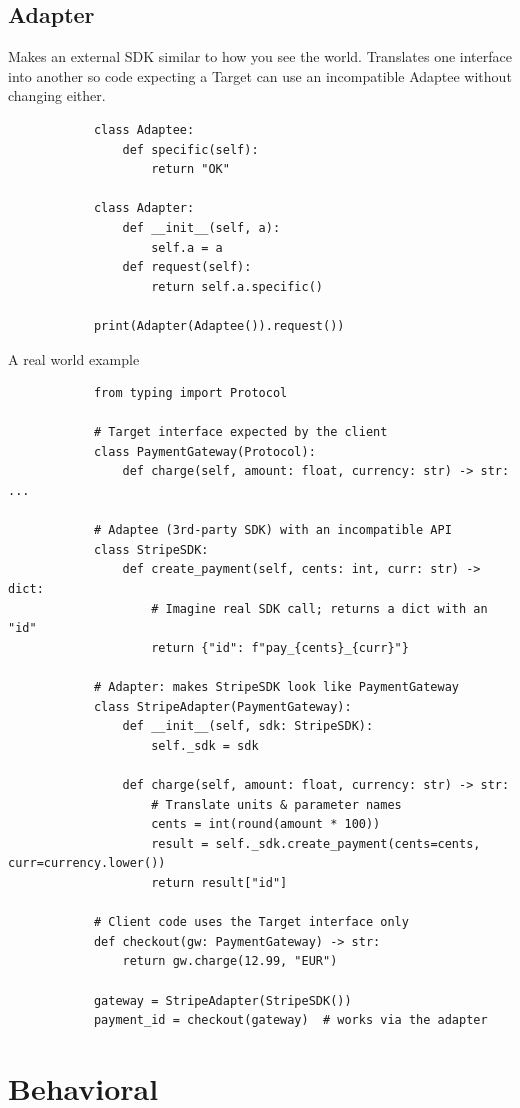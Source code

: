     \subsection{Adapter}
        Makes an external SDK similar to how you see the world. Translates one interface into another so code expecting a Target can use an incompatible Adaptee without changing either.
        \begin{verbatim}
            class Adaptee:
                def specific(self):
                    return "OK"

            class Adapter:
                def __init__(self, a):
                    self.a = a
                def request(self):
                    return self.a.specific()

            print(Adapter(Adaptee()).request())
        \end{verbatim}
        A real world example
        \begin{verbatim}
            from typing import Protocol

            # Target interface expected by the client
            class PaymentGateway(Protocol):
                def charge(self, amount: float, currency: str) -> str: ...

            # Adaptee (3rd-party SDK) with an incompatible API
            class StripeSDK:
                def create_payment(self, cents: int, curr: str) -> dict:
                    # Imagine real SDK call; returns a dict with an "id"
                    return {"id": f"pay_{cents}_{curr}"}

            # Adapter: makes StripeSDK look like PaymentGateway
            class StripeAdapter(PaymentGateway):
                def __init__(self, sdk: StripeSDK):
                    self._sdk = sdk

                def charge(self, amount: float, currency: str) -> str:
                    # Translate units & parameter names
                    cents = int(round(amount * 100))
                    result = self._sdk.create_payment(cents=cents, curr=currency.lower())
                    return result["id"]

            # Client code uses the Target interface only
            def checkout(gw: PaymentGateway) -> str:
                return gw.charge(12.99, "EUR")

            gateway = StripeAdapter(StripeSDK())
            payment_id = checkout(gateway)  # works via the adapter
        \end{verbatim}

\section{Behavioral}
